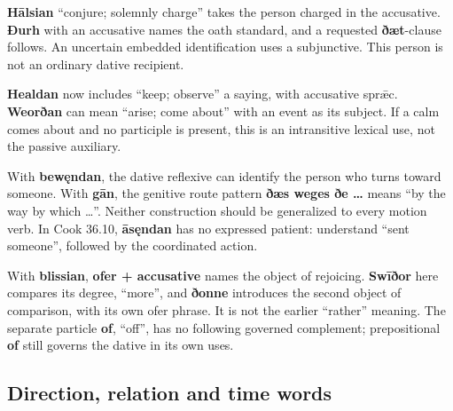 \textbf{Hālsian} “conjure; solemnly charge” takes the person charged in the accusative. \textbf{Ðurh} with an accusative names the oath standard, and a requested \textbf{ðæt}-clause follows. An uncertain embedded identification uses a subjunctive. This person is not an ordinary dative recipient.

\textbf{Healdan} now includes “keep; observe” a saying, with accusative sprǣc. \textbf{Weorðan} can mean “arise; come about” with an event as its subject. If a calm comes about and no participle is present, this is an intransitive lexical use, not the passive auxiliary.

With \textbf{bewęndan}, the dative reflexive can identify the person who turns toward someone. With \textbf{gān}, the genitive route pattern \textbf{ðæs weges ðe …} means “by the way by which …”. Neither construction should be generalized to every motion verb. In Cook 36.10, \textbf{āsęndan} has no expressed patient: understand “sent someone”, followed by the coordinated action.

With \textbf{blissian}, \textbf{ofer + accusative} names the object of rejoicing. \textbf{Swīðor} here compares its degree, “more”, and \textbf{ðonne} introduces the second object of comparison, with its own ofer phrase. It is not the earlier “rather” meaning. The separate particle \textbf{of}, “off”, has no following governed complement; prepositional \textbf{of} still governs the dative in its own uses.

\subsection*{Direction, relation and time words}

